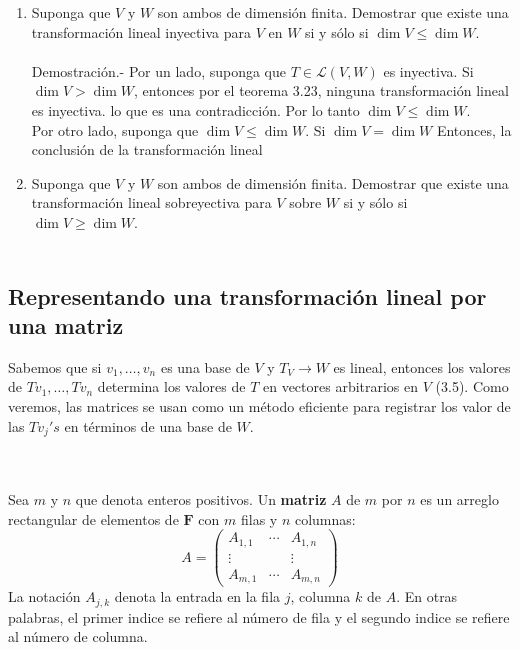 \begin{enumerate}[\bfseries 1.]
    \item Suponga que $V$ y $W$ son ambos de dimensión finita. Demostrar que existe una transformación lineal inyectiva para $V$ en $W$ si y sólo si $\dim V \leq \dim W$.\\\\
	Demostración.-\; Por un lado, suponga que $T\in \mathcal{L}(V,W)$ es inyectiva. Si $\dim V>\dim W$, entonces por el teorema 3.23, ninguna transformación lineal es inyectiva. lo que es una contradicción. Por lo tanto $\dim V\leq \dim W$.\\
	Por otro lado, suponga que $\dim V\leq \dim W$. Si $\dim V=\dim W$ Entonces, la conclusión de la transformación lineal 


    \item Suponga que $V$ y $W$ son ambos de dimensión finita. Demostrar que existe una transformación lineal sobreyectiva para $V$ sobre $W$ si y sólo si $\dim V \geq \dim W$.\\\\

\end{enumerate}


\subsection*{Representando una transformación lineal por una matriz}

Sabemos que si $v_1,\ldots,v_n$ es una base de $V$ y $T_V\to W$ es lineal, entonces los valores de $Tv_1,\ldots,Tv_n$ determina los valores de $T$ en vectores arbitrarios en $V$ (3.5). Como veremos, las matrices se usan como un método eficiente para registrar los valor de las $Tv_j's$ en términos de una base de $W$.

\begin{mydef}\;\\\\
    Sea $m$ y $n$ que denota enteros positivos. Un \textbf{matriz} $A$ de $m$ por $n$ es un arreglo rectangular de elementos de $\textbf{F}$ con $m$ filas y $n$ columnas:
    $$
    A=
    \begin{pmatrix}
	A_{1,1} & \cdots & A_{1,n}\\
	\vdots &  & \vdots\\
	A_{m,1} & \cdots & A_{m,n}
    \end{pmatrix}
    $$
    La notación $A_{j,k}$ denota la entrada en la fila $j$, columna $k$ de $A$. En otras palabras, el primer indice se refiere al número de fila y el segundo indice se refiere al número de columna.
\end{mydef}

